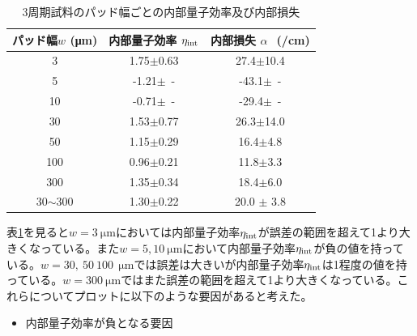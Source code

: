 {\begin{table}[h]
\begin{tabular}{ccc}
  \end{tabular}
\end{table}


\begin{table}[h]
  \caption{3周期試料のパッド幅ごとの内部量子効率及び内部損失}
  \label{table:table_3QW_i_int}
  \centering
  \begin{tabular}{ccc}
    \hline
    パッド幅$w$ (\si{\micro\metre})  &  内部量子効率 $\eta_{\rm{int}} $ &内部損失 $\alpha\ $\ (/\si{cm}) \\
    \hline \hline
     3 & 1.75$\pm$0.63 & 27.4$\pm$10.4  \\
    5  & -1.21$\pm$\ - & -43.1$\pm$\ -\\
    10  & -0.71$\pm$\ - & -29.4$\pm$\ -\\ 
    30& 1.53$\pm$0.77& 26.3$\pm$14.0\\
    50& 1.15$\pm$0.29&16.4$\pm$4.8 \\
    100& 0.96$\pm$0.21& 11.8$\pm$3.3\\
    300&1.35$\pm$0.34 & 18.4$\pm$6.0\\
    \hline
    30$\sim$300& 1.30$\pm$0.22 & 20.0 $\pm$ 3.8\\
    \hline
  \end{tabular}
\end{table}


表\ref{table:table_3QW_i_int}を見ると$w=3\ \si{\micro\metre}$においては内部量子効率$\eta_{\rm{int}}$が誤差の範囲を超えて1より大きくなっている。また$w=5, 10\ \si{\micro\metre}$において内部量子効率$\eta_{\rm{int}}$が負の値を持っている。$w=30,\ 50\ 100\ \ \si{\micro\metre}$では誤差は大きいが内部量子効率$\eta_{\rm{int}}$は1程度の値を持っている。$w=300\ \si{\micro\metre}$ではまた誤差の範囲を超えて1より大きくなっている。これらについてプロットに以下のような要因があると考えた。

\begin{itemize}
\item 内部量子効率が負となる要因


\end{itemize}}
